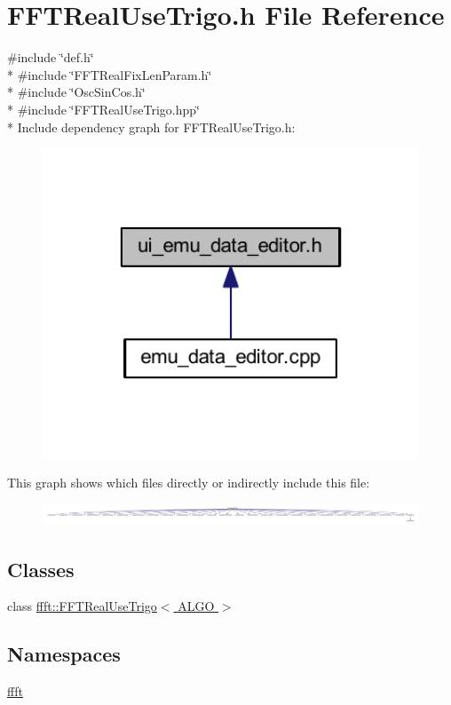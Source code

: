\hypertarget{a00106}{\section{F\+F\+T\+Real\+Use\+Trigo.\+h File Reference}
\label{a00106}
}
{\ttfamily \#include \char`\"{}def.\+h\char`\"{}}\\*
{\ttfamily \#include \char`\"{}F\+F\+T\+Real\+Fix\+Len\+Param.\+h\char`\"{}}\\*
{\ttfamily \#include \char`\"{}Osc\+Sin\+Cos.\+h\char`\"{}}\\*
{\ttfamily \#include \char`\"{}F\+F\+T\+Real\+Use\+Trigo.\+hpp\char`\"{}}\\*
Include dependency graph for F\+F\+T\+Real\+Use\+Trigo.\+h\+:
\nopagebreak
\begin{figure}[H]
\begin{center}
\leavevmode
\includegraphics[width=350pt]{dd/d56/a00274}
\end{center}
\end{figure}
This graph shows which files directly or indirectly include this file\+:
\nopagebreak
\begin{figure}[H]
\begin{center}
\leavevmode
\includegraphics[width=344pt]{d3/d5e/a00275}
\end{center}
\end{figure}
\subsection*{Classes}
\begin{DoxyCompactItemize}
\item 
class \hyperlink{a00016}{ffft\+::\+F\+F\+T\+Real\+Use\+Trigo$<$ A\+L\+G\+O $>$}
\end{DoxyCompactItemize}
\subsection*{Namespaces}
\begin{DoxyCompactItemize}
\item 
 \hyperlink{a00142}{ffft}
\end{DoxyCompactItemize}
